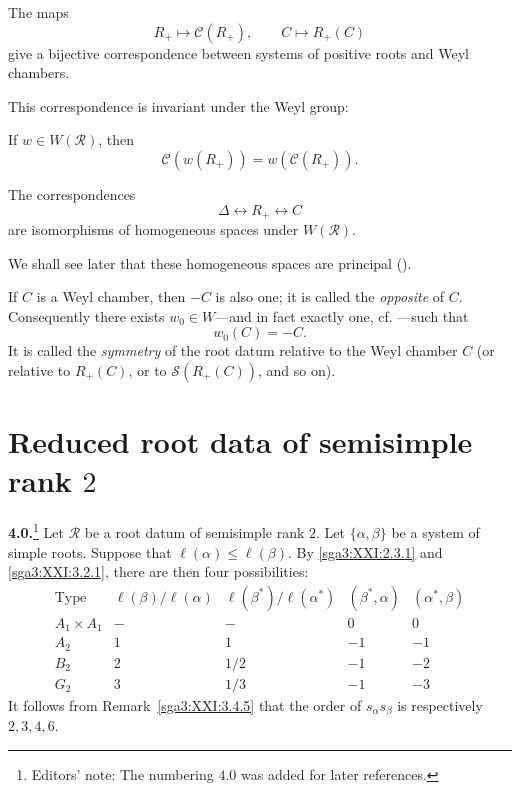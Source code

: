 \begin{corollary}\label{sga3:XXI:3.6.11}
The maps
\[
 R_+\longmapsto\mathcal{C}(R_+),
 \qquad
 C\longmapsto R_+(C)
\]
give a bijective correspondence between systems of positive roots
and Weyl chambers.
\end{corollary}

This correspondence is invariant under the Weyl group:

\begin{lemma}\label{sga3:XXI:3.6.12}
If \(w\in W(\mathcal{R})\), then
\[
 \mathcal{C}(w(R_+))=w(\mathcal{C}(R_+)).
\]
\end{lemma}

\begin{corollary}\label{sga3:XXI:3.6.13}
The correspondences
\[
 \Delta\longleftrightarrow R_+\longleftrightarrow C
\]
are isomorphisms of homogeneous spaces under \(W(\mathcal{R})\).
\end{corollary}

We shall see later that these homogeneous spaces are principal
().

\begin{remark}\label{sga3:XXI:3.6.14}
If \(C\) is a Weyl chamber, then \(-C\) is also one; it is called the
\emph{opposite} of \(C\). Consequently there exists
\(w_0\in W\)---and in fact exactly one, cf.
---such that
\[
 w_0(C)=-C.
\]
It is called the \emph{symmetry} of the root datum relative to the
Weyl chamber \(C\) (or relative to \(R_+(C)\), or to
\(\mathscr{S}(R_+(C))\), and so on).
\end{remark}


\section{Reduced root data of semisimple rank \(2\)}
\label{sga3:XXI:4}

\renewcommand{\thetheorem}{\thesection.\arabic{theorem}}
\setcounter{theorem}{0}

\noindent\textbf{4.0.}\footnote{Editors' note: The numbering \(4.0\)
was added for later references.}
Let \(\mathcal{R}\) be a root datum of semisimple rank \(2\). Let
\(\{\alpha,\beta\}\) be a system of simple roots. Suppose that
\(\ell(\alpha)\le\ell(\beta)\). By
\ref{sga3:XXI:2.3.1} and \ref{sga3:XXI:3.2.1}, there are then four
possibilities:
\[
\begin{array}{c|c|c|c|c}
\text{Type}
 &\ell(\beta)/\ell(\alpha)
 &\ell(\beta^\ast)/\ell(\alpha^\ast)
 &(\beta^\ast,\alpha)
 &(\alpha^\ast,\beta)\\ \hline
A_1\times A_1&-&-&0&0\\
A_2&1&1&-1&-1\\
B_2&2&1/2&-1&-2\\
G_2&3&1/3&-1&-3
\end{array}
\]
It follows from Remark~\ref{sga3:XXI:3.4.5} that the order of
\(s_\alpha s_\beta\) is respectively \(2,3,4,6\).

